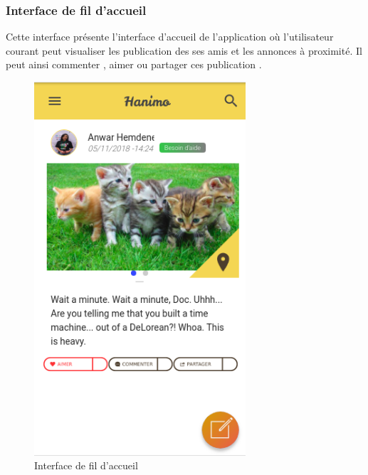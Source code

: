 \documentclass[11pt,a4paper,oneside]{book}
\begin{document}
					\subsubsection{Interface de fil d'accueil}
					Cette interface présente l’interface d'accueil de l’application où l’utilisateur courant peut visualiser les publication des ses amis et les annonces à proximité. Il peut ainsi commenter , aimer ou partager ces publication .
					\begin{figure}[H]
						\centering
						\includegraphics[width=0.7\textwidth]{Images/ch4/home}
						\caption{Interface de fil d'accueil}
						\label{fig:06-home-feed-with-fab}
					\end{figure}
				\vfill
				
\end{document}
